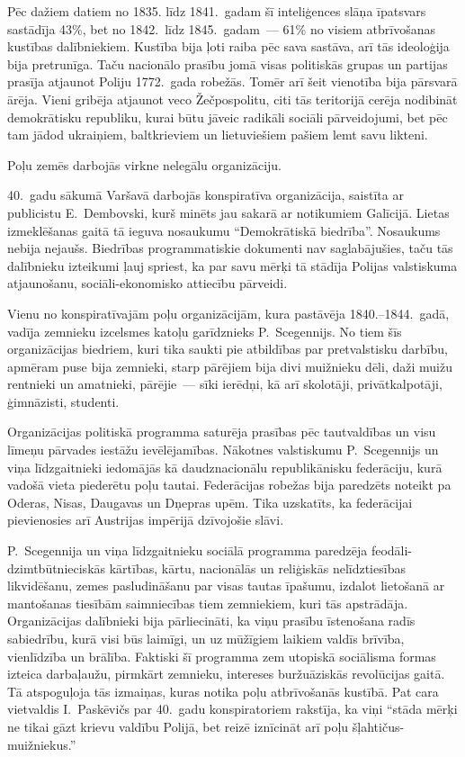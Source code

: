 \documentclass[twoside,a5paper,12pt,fleqn,openany]{extbook}
\begin{document}
Pēc dažiem datiem no 1835. līdz 1841.~gadam šī inteliģences slāņa īpatsvars sastādīja 43\%, bet no 1842.~līdz 1845.~gadam~--- 61\% no visiem atbrīvošanas kustības dalībniekiem. Kustība bija ļoti raiba pēc sava sastāva, arī tās ideoloģija bija pretrunīga. Taču nacionālo prasību jomā visas politiskās grupas un partijas prasīja atjaunot Poliju 1772.~gada robežās. Tomēr arī šeit vienotība bija pārsvarā ārēja. Vieni gribēja atjaunot veco Žečpospolitu, citi tās teritorijā cerēja nodibināt demokrātisku republiku, kurai būtu jāveic radikāli sociāli pārveidojumi, bet pēc tam jādod ukraiņiem, baltkrieviem un lietuviešiem pašiem lemt savu likteni.

Poļu zemēs darbojās virkne nelegālu organizāciju.

40.~gadu sākumā Varšavā darbojās konspiratīva organizācija, saistīta ar publicistu E.~Dembovski, kurš minēts jau sakarā ar notikumiem Galīcijā. Lietas izmeklēšanas gaitā tā ieguva nosaukumu ``Demokrātiskā biedrība''. Nosaukums nebija nejaušs. Biedrības programmatiskie dokumenti nav saglabājušies, taču tās dalībnieku izteikumi ļauj spriest, ka par savu mērķi tā stādīja Polijas valstiskuma atjaunošanu, sociāli-ekonomisko attiecību pārveidi.

Vienu no konspiratīvajām poļu organizācijām, kura pastāvēja 1840.--1844.~gadā, vadīja zemnieku izcelsmes katoļu garīdznieks P.~Scegennijs. No tiem šīs organizācijas biedriem, kuri tika saukti pie atbildības par pretvalstisku darbību, apmēram puse bija zemnieki, starp pārējiem bija divi muižnieku dēli, daži muižu rentnieki un amatnieki, pārējie~--- sīki ierēdņi, kā arī skolotāji, privātkalpotāji, ģimnāzisti, studenti.

Organizācijas politiskā programma saturēja prasības pēc tautvaldības un visu līmeņu pārvades iestāžu ievēlējamības. Nākotnes valstiskumu P.~Scegennijs un viņa līdzgaitnieki iedomājās kā daudznacionālu republikānisku federāciju, kurā vadošā vieta piederētu poļu tautai. Federācijas robežas bija paredzēts noteikt pa Oderas, Nisas, Daugavas un Dņepras upēm. Tika uzskatīts, ka federācijai pievienosies arī Austrijas impērijā dzīvojošie slāvi.

P.~Scegennija un viņa līdzgaitnieku sociālā programma paredzēja feodāli-dzimtbūtnieciskās kārtības, kārtu, nacionālās un reliģiskās nelīdztiesības likvidēšanu, zemes pasludināšanu par visas tautas īpašumu, izdalot lietošanā ar mantošanas tiesībām saimniecības tiem zemniekiem, kuri tās apstrādāja. Organizācijas dalībnieki bija pārliecināti, ka viņu prasību īstenošana radīs sabiedrību, kurā visi būs laimīgi, un uz mūžīgiem laikiem valdīs brīvība, vienlīdzība un brālība. Faktiski šī programma zem utopiskā sociālisma formas izteica darbaļaužu, pirmkārt zemnieku, intereses buržuāziskās revolūcijas gaitā. Tā atspoguļoja tās izmaiņas, kuras notika poļu atbrīvošanās kustībā. Pat cara vietvaldis I.~Paskēvičs par 40.~gadu konspiratoriem rakstīja, ka viņi ``stāda mērķi ne tikai gāzt krievu valdību Polijā, bet reizē iznīcināt arī poļu šļahtičus-muižniekus.''
\end{document}
